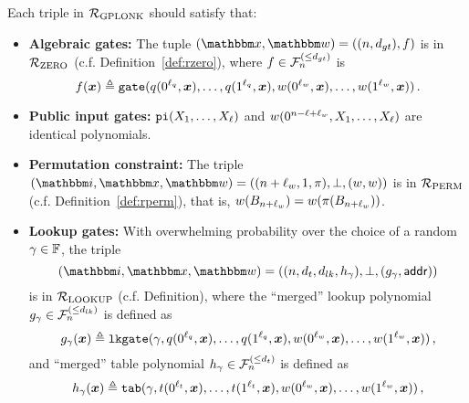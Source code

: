 \begin{definition}
    Each triple in ${\mathcal{R}}_{\text{GPLONK}}$ should satisfy that:
    \begin{itemize}
        \item \textbf{Algebraic gates:} The tuple $(\instR, \witR) = ((n,\dgate), f)$ is in ${\mathcal{R}}_{\text{ZERO}}$ (c.f. Definition~\ref{def:rzero}),
            where $f \in {\mathcal{F}}_{n}^{(\le{d_{gt}})}$ is
            \[
              f(\boldsymbol{x}) \mathrel{\triangleq} \mathtt{gate}(q(0^{\ell_q}, \boldsymbol{x}), \dots, q(1^{\ell_q}, \boldsymbol{x}), w(0^{\ell_w}, \boldsymbol{x}), \dots, w(1^{\ell_w}, \boldsymbol{x})) \,.
            \] 
        \item \textbf{Public input gates:} $\mathtt{pi}(X_1, \dots, X_{\ell})$ and $w(0^{n-\ell+\ell_w}, X_1, \dots, X_{\ell})$
            are identical polynomials.
        \item \textbf{Permutation constraint:} The triple $(\idxR, \instR, \witR)=((n+\lwit, 1, \perm), \bot, (\witp, \witp))$ 
            is in ${\mathcal{R}}_{\text{PERM}}$ (c.f. Definition~\ref{def:rperm}), that is, $w(B_{n+\ell_w}) = w(\pi(B_{n+\ell_w}))$.
        \item \textbf{Lookup gates:} 
            With overwhelming probability over the choice of a random $\gamma \in \mathbb{F}$,
            the triple 
            \[
                (\idxR, \instR, \witR)=((n, \dtab, \dlk, h_{\gamma}), \bot, (g_{\gamma}, \addr))
            \]
            is in ${\mathcal{R}}_{\text{LOOKUP}}$ (c.f. Definition), where the ``merged'' lookup polynomial $g_{\gamma} \in {\mathcal{F}}_{n}^{(\le{d_{lk}})}$ is defined as 
            \[
              g_{\gamma}(\boldsymbol{x}) \mathrel{\triangleq} \mathtt{lkgate}(\gamma, q(0^{\ell_q}, \boldsymbol{x}), \dots, q(1^{\ell_q}, \boldsymbol{x}), w(0^{\ell_w}, \boldsymbol{x}), \dots, w(1^{\ell_w}, \boldsymbol{x})) \,,
            \]
            and ``merged'' table polynomial $h_{\gamma} \in {\mathcal{F}}_{n}^{(\le{d_t})}$ is defined as 
            \[
              h_{\gamma}(\boldsymbol{x}) \mathrel{\triangleq} \mathtt{tab}(\gamma, t(0^{\ell_t}, \boldsymbol{x}), \dots, t(1^{\ell_t}, \boldsymbol{x}), w(0^{\ell_w}, \boldsymbol{x}), \dots, w(1^{\ell_w}, \boldsymbol{x})) \,,
            \]
    \end{itemize}
\end{definition}